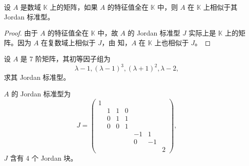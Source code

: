 \documentclass[../../main.tex]{subfiles}
\begin{document}
\begin{corollary}
设 $A$ 是数域 $\mathbb{K}$ 上的矩阵，如果 $A$ 的特征值全在 $\mathbb{K}$ 中，则 $A$ 在 $\mathbb{K}$ 上相似于其 Jordan 标准型。
\end{corollary}
\begin{proof}
由于 $A$ 的特征值全在 $\mathbb{K}$ 中，故 $A$ 的 Jordan 标准型 $J$ 实际上是 $\mathbb{K}$ 上的矩阵。因为 $A$ 在复数域上相似于 $J$，由 知，$A$ 在 $\mathbb{K}$ 上也相似于 $J$。
\end{proof}

\begin{example}
设 $A$ 是 7 阶矩阵，其初等因子组为
\[
\lambda - 1, (\lambda - 1)^3, (\lambda + 1)^2, \lambda - 2,
\]
求其 Jordan 标准型。
\end{example}
\begin{solution}
$A$ 的 Jordan 标准型为
\[
J = \begin{pmatrix}
1 & & & & & & \\
& 1 & 1 & 0 & & & \\
& 0 & 1 & 1 & & & \\
& 0 & 0 & 1 & & & \\
& & & & -1 & 1 & \\
& & & & 0 & -1 & \\
& & & & & & 2
\end{pmatrix},
\]
$J$ 含有 4 个 Jordan 块。
\end{solution}
\end{document}
